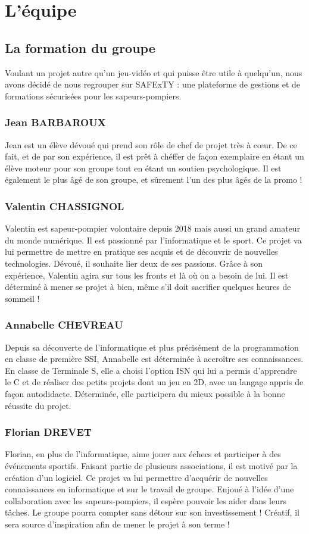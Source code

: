 \section{L'équipe}
\subsection{La formation du groupe}

Voulant un projet autre qu'un jeu-vidéo et qui puisse être utile à quelqu’un, nous avons décidé de nous regrouper sur SAFExTY : une plateforme de gestions et de formations sécurisées pour les sapeurs-pompiers.

\subsubsection{Jean BARBAROUX}
Jean est un élève dévoué qui prend son rôle de chef de projet très à cœur. De ce fait, et de par son expérience, il est prêt à chéffer de façon exemplaire en étant un élève moteur pour son groupe tout en étant un soutien psychologique. Il est également le plus âgé de son groupe, et sûrement l'un des plus âgés de la promo !

\subsubsection{Valentin CHASSIGNOL}
Valentin est sapeur-pompier volontaire depuis 2018 mais aussi un grand amateur du monde numérique. Il est passionné par l'informatique et le sport. Ce projet va lui permettre de mettre en pratique ses acquis et de découvrir de nouvelles technologies. Dévoué, il souhaite lier deux de ses passions. Grâce à son expérience, Valentin agira sur tous les fronts et là où on a besoin de lui. Il est déterminé à mener se projet à bien, même s'il doit sacrifier quelques heures de sommeil !

\subsubsection{Annabelle CHEVREAU}
Depuis sa découverte de l'informatique et plus précisément de la programmation en classe de première SSI, Annabelle est déterminée à accroître ses connaissances. En classe de Terminale S, elle a choisi l'option ISN qui lui a permis d'apprendre le C et de réaliser des petits projets dont un jeu en 2D, avec un langage appris de façon autodidacte. Déterminée, elle participera du mieux possible à la bonne réussite du projet.

\subsubsection{Florian DREVET}
Florian, en plus de l'informatique, aime jouer aux échecs et participer à des événements sportifs. Faisant partie de plusieurs associations, il est motivé par la création d'un logiciel. Ce projet va lui permettre d'acquérir de nouvelles connaissances en informatique et sur le travail de groupe. Enjoué à l'idée d'une collaboration avec les sapeurs-pompiers, il espère pouvoir les aider dans leurs tâches. Le groupe pourra compter sans détour sur son investissement ! Créatif, il sera source d'inspiration afin de mener le projet à son terme !
